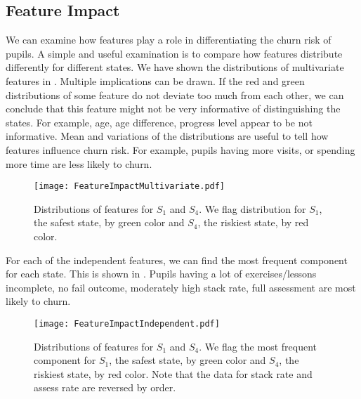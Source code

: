 \vspace*{-0.5cm}
\subsection{Feature Impact}

We can examine how features play a role in differentiating the churn risk of pupils. A simple and useful examination is to compare how features distribute differently for different states. We have shown the distributions of multivariate features in . Multiple implications can be drawn. If the red and green distributions of some feature do not deviate too much from each other, we can conclude that this feature might not be very informative of distinguishing the states. For example, age, age difference, progress level appear to be not informative. Mean and variations of the distributions are useful to tell how features influence churn risk. For example, pupils having more visits, or spending more time are less likely to churn.

\begin{figure}[!h]
\centering
\vspace*{-0.3cm}
\texttt{[image: FeatureImpactMultivariate.pdf]}
\caption{Distributions of features for $S_1$ and $S_4$. We flag distribution for $S_1$, the safest state, by green color and $S_4$, the riskiest state, by red color.}
\label{fig:ftrImpMulti}
\end{figure}

For each of the independent features, we can find the most frequent component for each state. This is shown in . Pupils having a lot of exercises/lessons incomplete, no fail outcome, moderately high stack rate, full assessment are most likely to churn.

\begin{figure}[!h]
\centering
\vspace*{-0.3cm}
\texttt{[image: FeatureImpactIndependent.pdf]}
\caption{Distributions of features for $S_1$ and $S_4$. We flag the most frequent component for $S_1$, the safest state, by green color and $S_4$, the riskiest state, by red color. Note that the data for stack rate and assess rate are reversed by order.}
\label{fig:ftrImpIndep}
\end{figure}